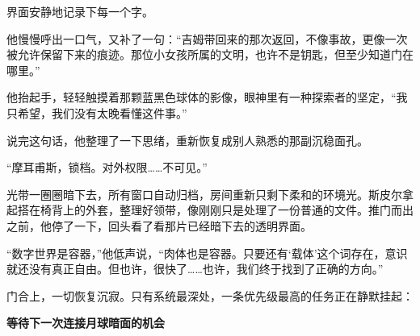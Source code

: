 界面安静地记录下每一个字。

他慢慢呼出一口气，又补了一句：“吉姆带回来的那次返回，不像事故，更像一次被允许保留下来的痕迹。那位小女孩所属的文明，也许不是钥匙，但至少知道门在哪里。”

他抬起手，轻轻触摸着那颗蓝黑色球体的影像，眼神里有一种探索者的坚定，“我只希望，我们没有太晚看懂这件事。”

说完这句话，他整理了一下思绪，重新恢复成别人熟悉的那副沉稳面孔。

“摩耳甫斯，锁档。对外权限……不可见。”

光带一圈圈暗下去，所有窗口自动归档，房间重新只剩下柔和的环境光。斯皮尔拿起搭在椅背上的外套，整理好领带，像刚刚只是处理了一份普通的文件。推门而出之前，他停了一下，回头看了看那片已经暗下去的透明界面。

“数字世界是容器，”他低声说，“肉体也是容器。只要还有‘载体’这个词存在，意识就还没有真正自由。但也许，很快了……也许，我们终于找到了正确的方向。”

门合上，一切恢复沉寂。只有系统最深处，一条优先级最高的任务正在静默挂起：

\begin{center}
\textbf{等待下一次连接月球暗面的机会}
\end{center}
